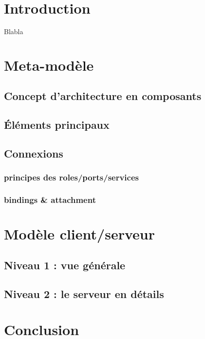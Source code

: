 \chapter*{Introduction}
	Blabla


\chapter{Meta-modèle}
	\section{Concept d'architecture en composants}
	
	
	\section{Éléments principaux}
	
	
	\section{Connexions}
		\subsection{principes des roles/ports/services}
		
		\subsection{bindings \& attachment}


\chapter{Modèle client/serveur}
	\section{Niveau 1 : vue générale}
	
	
	\section{Niveau 2 : le serveur en détails}


\chapter*{Conclusion}
	
